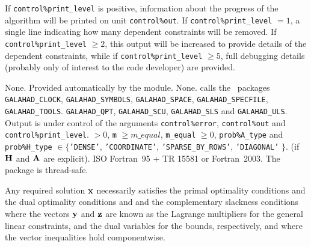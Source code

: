 \documentclass{galahad}
\newcommand{\packagename}{CRO}
\begin{document}

\galinfo
If {\tt control\%print\_level} is positive, information about the progress
of the algorithm will be printed on unit {\tt control\-\%out}.
If {\tt control\%print\_level} $= 1$, a single line indicating how many
dependent constraints will be removed.
If {\tt control\%print\_level} $\geq 2$, this
output will be increased to provide details of the dependent constraints,
while if {\tt control\%print\_level} $\geq 5$, full debugging details
(probably only of interest to the code developer) are provided.


\galgeneral

\galcommon None.
\galworkspace Provided automatically by the module.
\galroutines None.
\galmodules {\tt \packagename\_crossover} calls the \galahad\ packages
{\tt GALAHAD\_CLOCK},
{\tt GALAHAD\_SY\-M\-BOLS},
{\tt GALAHAD\-\_SPACE},
{\tt GALAHAD\_\-SPECFILE},
{\tt GALAHAD\_TOOLS}.
{\tt GALAHAD\_QPT},
{\tt GALAHAD\_\-SCU},
{\tt GALAHAD\_\-SLS}
and
{\tt GALAHAD\_\-ULS}.
\galio Output is under control of the arguments
 {\tt control\%error}, {\tt control\%out} and {\tt control\%print\_level}.
 $> 0$, {\tt m} $\geq  m\_equal$,
{\tt m\_equal} $\geq  0$,
{\tt prob\%A\_type} and {\tt prob\%H\_type} $\in \{${\tt 'DENSE'},
 {\tt 'COORDINATE'}, {\tt 'SPARSE\_BY\_\-ROWS'}, {\tt 'DIAGONAL'} $\}$.
(if ${\mathbf{H}}$ and ${\mathbf{A}}$ are explicit).
\galportability ISO Fortran~95 + TR 15581 or Fortran~2003.
The package is thread-safe.


\galmethod
Any required solution ${\mathbf{x}}$ necessarily satisfies
the primal optimality conditions
and
the dual optimality conditions
and
and the complementary slackness conditions
where the vectors ${\mathbf{y}}$ and ${\mathbf{z}}$ are
known as the Lagrange multipliers for
the general linear constraints, and the dual variables for the bounds,
respectively, and where the vector inequalities hold componentwise.
\end{document}
